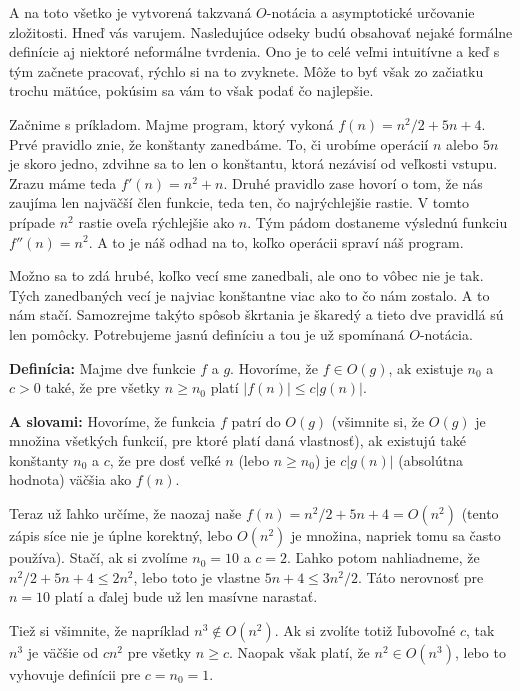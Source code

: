 A na toto všetko je vytvorená takzvaná $O$-notácia a asymptotické určovanie zložitosti.
Hneď vás varujem. Nasledujúce odseky budú obsahovať nejaké formálne definície aj niektoré neformálne
tvrdenia. Ono je to celé veľmi intuitívne a keď s tým začnete pracovať, rýchlo si na to zvyknete.
Môže to byť však zo začiatku trochu mätúce, pokúsim sa vám to však podať čo najlepšie.


Začnime s príkladom. Majme program, ktorý vykoná $f(n) = n^2/2 + 5n + 4$. Prvé pravidlo znie,
že konštanty zanedbáme. To, či urobíme operácií $n$ alebo $5n$ je skoro jedno, zdvihne sa to len o
konštantu, ktorá nezávisí od veľkosti vstupu. Zrazu máme teda $f'(n) = n^2 + n$. Druhé pravidlo zase
hovorí o tom, že nás zaujíma len najväčší člen funkcie, teda ten, čo najrýchlejšie rastie. V tomto
prípade $n^2$ rastie oveľa rýchlejšie ako $n$. Tým pádom dostaneme výslednú funkciu $f''(n) = n^2$.
A to je náš odhad na to, koľko operácii spraví náš program.

Možno sa to zdá hrubé, koľko vecí sme zanedbali, ale ono to vôbec nie je tak. Tých zanedbaných vecí
je najviac konštantne viac ako to čo nám zostalo. A to nám stačí. Samozrejme takýto spôsob škrtania
je škaredý a tieto dve pravidlá sú len pomôcky. Potrebujeme jasnú definíciu a tou je už spomínaná
$O$-notácia.

\textbf{Definícia:} Majme dve funkcie $f$ a $g$. Hovoríme, že $f \in O(g)$, ak existuje $n_0$ a $c>0$
také, že pre všetky $n \geq n_0$ platí $|f(n)|\leq c|g(n)|$.

\textbf{A slovami:} Hovoríme, že funkcia $f$ patrí do $O(g)$ (všimnite si, že $O(g)$ je množina
všetkých funkcií, pre ktoré platí daná vlastnosť), ak existujú také konštanty $n_0$ a $c$, že pre dosť veľké $n$ (lebo $n \geq n_0$) je
$c|g(n)|$ (absolútna hodnota) väčšia ako $f(n)$.

Teraz už ľahko určíme, že naozaj naše $f(n) = n^2/2 + 5n +4 = O(n^2)$ (tento zápis síce nie je úplne
korektný, lebo $O(n^2)$ je množina, napriek tomu sa často používa). Stačí, ak si zvolíme $n_0=10$ a
$c=2$. Ľahko potom nahliadneme, že $n^2/2 + 5n + 4 \leq 2n^2$, lebo toto je vlastne $5n + 4 \leq
3n^2/2$. Táto nerovnosť pre $n=10$ platí a ďalej bude už len masívne narastať.

Tiež si všimnite, že napríklad $n^3 \notin O(n^2)$. Ak si zvolíte totiž ľubovoľné $c$, tak $n^3$ je
väčšie od $cn^2$ pre všetky $n\geq c$. Naopak však platí, že $n^2 \in O(n^3)$, lebo to vyhovuje
definícii pre $c=n_0=1$.

